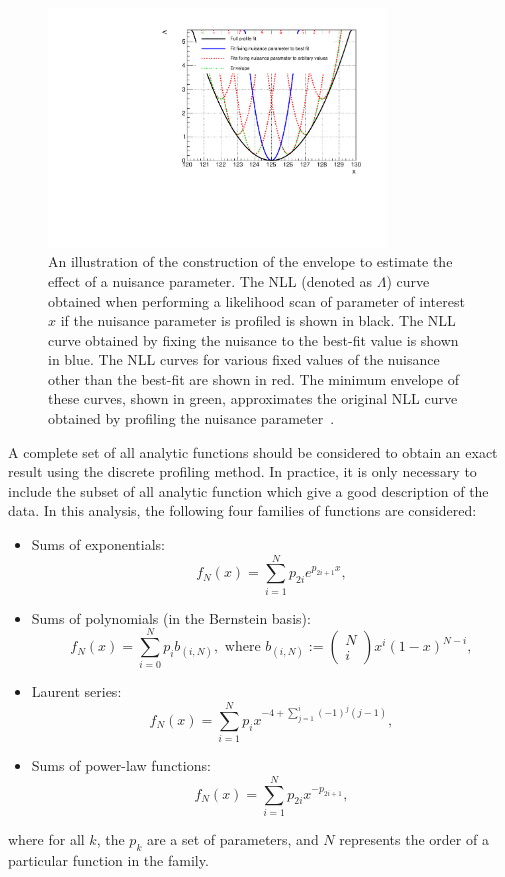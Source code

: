 \begin{figure}[ht!]
\centering
\includegraphics[width=0.8\textwidth]{modellingFigures/envelope_cartoon.pdf} 
\caption{An illustration of the construction of the envelope to estimate the effect of a nuisance parameter. The NLL (denoted as $\Lambda$) curve obtained when performing a likelihood scan of parameter of interest $x$ if the nuisance parameter is profiled is shown in black. The NLL curve obtained by fixing the nuisance to the best-fit value is shown in blue. The NLL curves for various fixed values of the nuisance other than the best-fit are shown in red. The minimum envelope of these curves, shown in green, approximates the original NLL curve obtained by profiling the nuisance parameter~\cite{DiscreteProfiling}.}

\label{fig:model:bkg_envelope}
\end{figure}

A complete set of all analytic functions should be considered to obtain an exact result using the discrete profiling method. In practice, it is only necessary to include the subset of all analytic function which give a good description of the data. In this analysis, the following four families of functions are considered:

\begin{itemize}
\item Sums of exponentials: $$ f_{N}(x)= \sum^{N}_{i=1} p_{2i} e^{p_{2i+1} x} ,$$
\item Sums of polynomials (in the Bernstein basis): $$ f_{N}(x) = \sum^{N}_{i=0} p_{i} b_{(i,N)}, \text{ where } b_{(i,N)}:= \begin{pmatrix} N \\ i \end{pmatrix} x^i (1-x)^{N-i} ,$$
\item Laurent series: $$ f_{N}(x)= \sum^{N}_{i=1} p_{i} x^{-4 + \sum^{i}_{j=1} (-1)^{j} (j-1)},$$
\item Sums of power-law functions: $$ f_{N}(x)= \sum^{N}_{i=1} p_{2i} x^{-p_{2i+1}},$$
\end{itemize}
where for all $k$, the $p_k$ are a set of parameters, and $N$ represents the order of a particular function in the family.  

